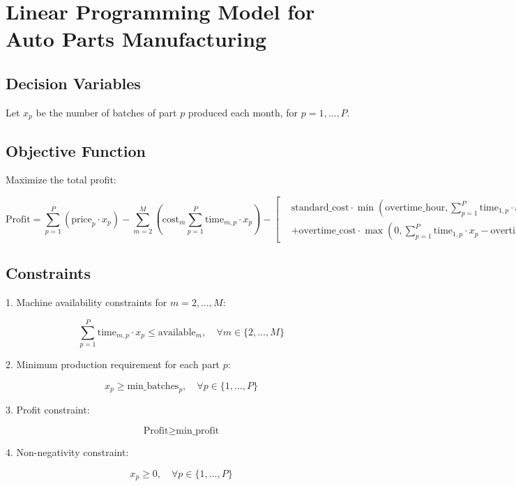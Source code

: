 \documentclass{article}
\begin{document}
\section*{Linear Programming Model for Auto Parts Manufacturing}

\subsection*{Decision Variables}
Let \( x_p \) be the number of batches of part \( p \) produced each month, for \( p = 1, \ldots, P \).

\subsection*{Objective Function}
Maximize the total profit:

\[
\text{Profit} = \sum_{p=1}^P \left( \text{price}_p \cdot x_p \right) - \sum_{m=2}^M \left( \text{cost}_m \sum_{p=1}^P \text{time}_{m,p} \cdot x_p \right) - \left[ \begin{aligned}
    & \text{standard\_cost} \cdot \min\left(\text{overtime\_hour}, \sum_{p=1}^P \text{time}_{1,p} \cdot x_p \right) \\
    & + \text{overtime\_cost} \cdot \max\left(0, \sum_{p=1}^P \text{time}_{1,p} \cdot x_p - \text{overtime\_hour} \right)
\end{aligned} \right]
\]

\subsection*{Constraints}
1. Machine availability constraints for \( m = 2, \ldots, M \):

\[
\sum_{p=1}^P \text{time}_{m,p} \cdot x_p \leq \text{available}_m, \quad \forall m \in \{2, \ldots, M\}
\]

2. Minimum production requirement for each part \( p \):

\[
x_p \geq \text{min\_batches}_p, \quad \forall p \in \{1, \ldots, P\}
\]

3. Profit constraint:

\[
\text{Profit} \geq \text{min\_profit}
\]

4. Non-negativity constraint:

\[
x_p \geq 0, \quad \forall p \in \{1, \ldots, P\}
\]
\end{document}
